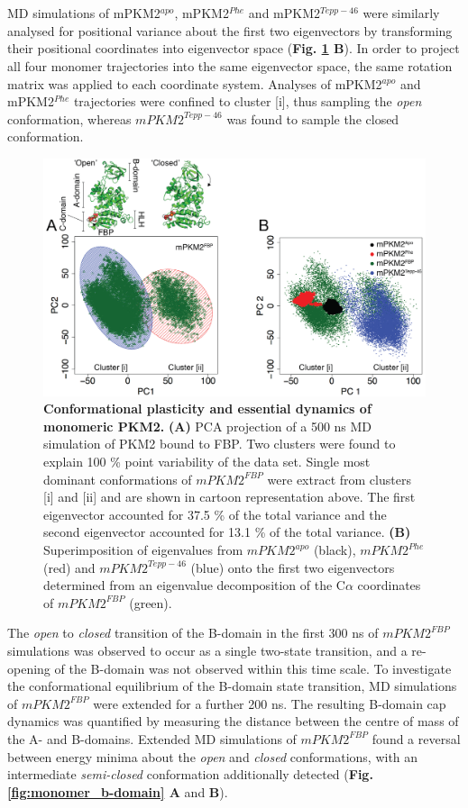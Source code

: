%
%
\\\\
%
%
MD simulations of mPKM2$^{apo}$, mPKM2$^{Phe}$ and mPKM2$^{Tepp-46}$ were similarly analysed for positional variance about the first two eigenvectors by transforming their positional coordinates into eigenvector space (\textbf{Fig. \ref{fig:monomer_pca} B}). In order to project all four monomer trajectories into the same eigenvector space, the same rotation matrix was applied to each coordinate system. Analyses of mPKM2$^{apo}$ and mPKM2$^{Phe}$ trajectories were confined to cluster [i], thus sampling the \textit{open} conformation, whereas $mPKM2^{Tepp-46}$ was found to sample the closed conformation. 
%
%
%
%
%
\begin{figure}[!ht]
\includegraphics[scale=0.7]{ch6_fig2_monomer_pca.png}
\caption[Conformational plasticity and essential dynamics of monomeric PKM2.]{\textbf{Conformational plasticity and essential dynamics of monomeric PKM2.} \textbf{(A)} PCA projection of a 500 ns MD simulation of PKM2 bound to FBP. Two clusters were found to explain 100 \% point variability of the data set. Single most dominant conformations of $mPKM2^{FBP}$ were extract from clusters [i] and [ii] and are shown in cartoon representation above. The first eigenvector accounted for 37.5 \% of the total variance and the second eigenvector accounted for 13.1 \% of the total variance. \textbf{(B)} Superimposition of eigenvalues from $mPKM2^{apo}$ (black), $mPKM2^{Phe}$ (red) and $mPKM2^{Tepp-46}$ (blue) onto the first two eigenvectors determined from an eigenvalue decomposition of the C$\alpha$ coordinates of $mPKM2^{FBP}$ (green).}
\label{fig:monomer_pca}
\end{figure}
%
\clearpage
%
%
The \textit{open} to \textit{closed} transition of the B-domain in the first 300 ns of $mPKM2^{FBP}$ simulations was observed to occur as a single two-state transition, and a re-opening of the B-domain was not observed within this time scale. To investigate the conformational equilibrium of the B-domain state transition, MD simulations of $mPKM2^{FBP}$ were extended for a further 200 ns. The resulting B-domain cap dynamics was quantified by measuring the distance between the centre of mass of the A- and B-domains. Extended MD simulations of $mPKM2^{FBP}$  found a reversal between energy minima about the \textit{open} and \textit{closed} conformations, with an intermediate \textit{semi-closed} conformation additionally detected (\textbf{Fig. \ref{fig:monomer_b-domain} A} and \textbf{B}).
